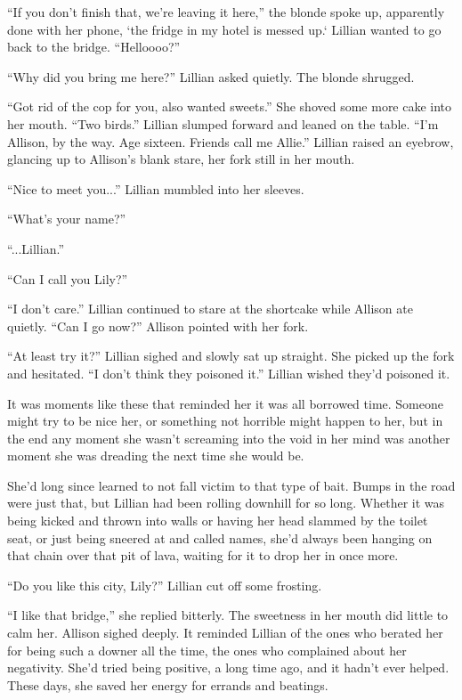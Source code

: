 \begin{Standard}
``If you don't finish that, we're leaving it here,'' the blonde spoke up, apparently done with
her phone, `the fridge in my hotel is messed up.` Lillian wanted to go back to the bridge.
``Helloooo?''

``Why did you bring me here?'' Lillian asked quietly. The blonde shrugged.

``Got rid of the cop for you, also wanted sweets.'' She shoved some more cake into her mouth.
``Two birds.'' Lillian slumped forward and leaned on the table. ``I'm Allison, by the way.
Age sixteen. Friends call me Allie.'' Lillian raised an eyebrow, glancing up to Allison's blank
stare, her fork still in her mouth.

``Nice to meet you...'' Lillian mumbled into her sleeves.

``What's your name?''

``...Lillian.''

``Can I call you Lily?''

``I don't care.'' Lillian continued to stare at the shortcake while Allison ate quietly.
``Can I go now?'' Allison pointed with her fork.

``At least try it?'' Lillian sighed and slowly sat up straight. She picked up the fork and
hesitated. ``I don't think they poisoned it.'' Lillian wished they'd poisoned it.

It was moments like these that reminded her it was all borrowed time. Someone might try to be nice
her, or something not horrible might happen to her, but in the end any moment she wasn't
screaming into the void in her mind was another moment she was dreading the next time
she would be.

She'd long since learned to not fall victim to that type of bait. Bumps
in the road were just that, but Lillian had been rolling downhill for so long. Whether it was
being kicked and thrown into walls or having her head slammed by the toilet seat, or
just being sneered at and called names, she'd always been hanging on that chain over
that pit of lava, waiting for it to drop her in once more.

``Do you like this city, Lily?'' Lillian cut off some frosting.

``I like that bridge,'' she replied bitterly. The sweetness in her mouth did little
to calm her. Allison sighed deeply. It reminded Lillian of the ones who berated her
for being such a downer all the time, the ones who complained about her negativity.
She'd tried being positive, a long time ago, and it hadn't ever helped. These days,
she saved her energy for errands and beatings.


\end{Standard}
